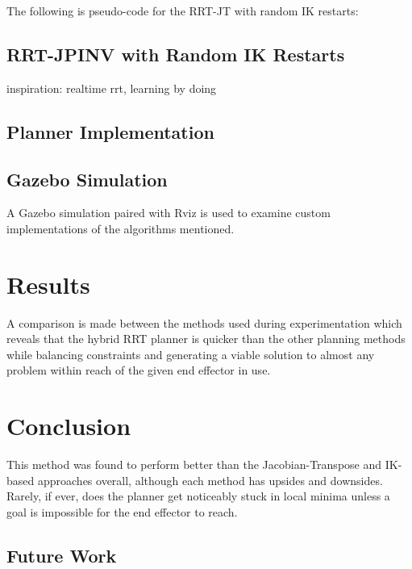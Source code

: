 \documentclass[conference]{IEEEtran} \usepackage[T1]{fontenc} \usepackage[backend=biber, style=ieee]{biblatex}
\begin{document}
The following is pseudo-code for the RRT-JT with random IK restarts:

\subsection{RRT-JPINV with Random IK Restarts}


inspiration: realtime rrt, learning by doing


\subsection{Planner Implementation} \label{Planner Implementation}

\subsection{Gazebo Simulation} \label{Gazebo Simulation}
 A Gazebo simulation paired with Rviz is used to examine custom implementations of the algorithms mentioned. 
 
\section{Results} \label{Results}
A comparison is made between the methods used 
during experimentation which reveals that the hybrid RRT planner is quicker than the other planning methods while balancing constraints and generating a viable solution to 
almost any problem within reach of the given end effector in use.

\section{Conclusion} \label{Conclusion} 
This method was found to perform better than the Jacobian-Transpose and IK-based approaches overall, although 
each method has upsides and downsides. Rarely, if ever, does the planner get noticeably stuck in local minima unless a goal is impossible for the end effector to 
reach.

\subsection{Future Work}

\printbibliography
\end{document}
